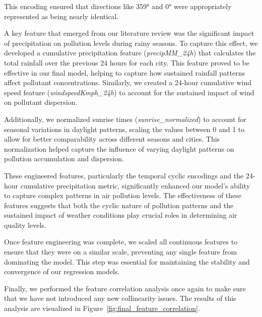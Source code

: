 \documentclass[twoside,11pt]{article}
\begin{document}
This encoding ensured that directions like 359° and 0° were appropriately represented as being nearly identical.

A key feature that emerged from our literature review was the significant impact of precipitation on pollution levels during rainy seasons. To capture this effect, we developed a cumulative precipitation feature (\textit{precipMM\_24h}) that calculates the total rainfall over the previous 24 hours for each city. This feature proved to be effective in our final model, helping to capture how sustained rainfall patterns affect pollutant concentrations. Similarly, we created a 24-hour cumulative wind speed feature (\textit{windspeedKmph\_24h}) to account for the sustained impact of wind on pollutant dispersion.

Additionally, we normalized sunrise times (\textit{sunrise\_normalized}) to account for seasonal variations in daylight patterns, scaling the values between 0 and 1 to allow for better comparability across different seasons and cities. This normalization helped capture the influence of varying daylight patterns on pollution accumulation and dispersion.

These engineered features, particularly the temporal cyclic encodings and the 24-hour cumulative precipitation metric, significantly enhanced our model's ability to capture complex patterns in air pollution levels. The effectiveness of these features suggests that both the cyclic nature of pollution patterns and the sustained impact of weather conditions play crucial roles in determining air quality levels.

Once feature engineering was complete, we scaled all continuous features to ensure that they were on a similar scale, preventing any single feature from dominating the model. This step was essential for maintaining the stability and convergence of our regression models.

Finally, we performed the feature correlation analysis once again to make sure that we have not introduced any new collinearity issues. The results of this analysis are visualized in Figure~\ref{fig:final_feature_correlation}.
\end{document}
